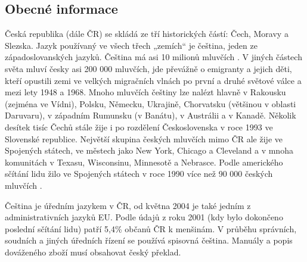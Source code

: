 \begin{multicols}{2}
  \subsection{Obecné informace}

Česká republika (dále ČR) se skládá ze tří historických částí: Čech, Moravy a Slezska. Jazyk používaný ve všech třech „zemích“ je čeština, jeden ze západoslovanských jazyků. Čeština má asi 10 milionů mluvčích \cite{Note1}. V jiných částech světa mluví česky asi 200 000 mluvčích, jde převážně o emigranty a jejich děti, kteří opustili zemi ve velkých migračních vlnách po první a druhé světové válce a mezi lety 1948 a 1968. Mnoho mluvčích češtiny lze nalézt hlavně v Rakousku (zejména ve Vídni), Polsku, Německu, Ukrajině, Chorvatsku (většinou v oblasti Daruvaru), v západním Rumunsku (v Banátu), v Austrálii a v Kanadě. Několik desítek tisíc Čechů stále žije i po rozdělení Československa v roce 1993 ve Slovenské republice. Největší skupina českých mluvčích mimo ČR ale žije ve Spojených státech, ve městech jako New York, Chicago a Cleveland a v mnoha komunitách v Texasu, Wisconsinu, Minnesotě a Nebrasce. Podle amerického sčítání lidu žilo ve Spojených státech v roce 1990 více než 90 000 českých mluvčích \cite{Note2}.

Čeština je úředním jazykem v ČR, od května 2004 je také jedním z administrativních jazyků EU. Podle údajů z roku 2001 (kdy bylo dokončeno poslední sčítání lidu) patří 5,4\% občanů ČR k menšinám. V průběhu správních, soudních a jiných úředních řízení se používá spisovná čeština. Manuály a popis dováženého zboží musí obsahovat český překlad.


\end{multicols}
